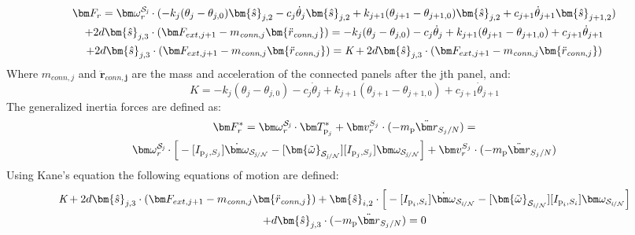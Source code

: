 \begin{multline}
	\bm F_{r} = \bm \omega_{\textit{r}}^{\cal{S}_\textit{j}} \cdot (-k_j (\theta_j-\theta_{j,0}) \bm{\hat{s}}_{j,2} - c_j \dot{\theta}_j \bm{\hat{s}}_{j,2}  +k_{j+1} (\theta_{j+1}-\theta_{j+1,0}) \bm{\hat{s}}_{j,2} +c_{j+1} \dot{\theta}_{j+1} \bm{\hat{s}}_{j+1,2})\\
	+ 2d\bm{\hat{s}}_{j,3}\cdot(\bm F_{ext,j+1} - m_{\textit{conn},j}\bm{\ddot{r}_{\textit{conn},j}}) =
	-k_j (\theta_j-\theta_{j,0}) - c_j \dot{\theta}_j + k_{j+1} (\theta_{j+1}-\theta_{j+1,0}) + c_{j+1} \dot{\theta}_{j+1}\\
	+ 2d\bm{\hat{s}}_{j,3}\cdot(\bm F_{ext,j+1} - m_{\textit{conn},j}\bm{\ddot{r}_{\textit{conn},j}}) = \textit{K} + 2d\bm{\hat{s}}_{j,3}\cdot(\bm F_{ext,j+1} - m_{\textit{conn},j}\bm{\ddot{r}_{\textit{conn},j}})
\end{multline}
Where $m_{\textit{conn},j}$ and $\bm{\ddot{r}_{\textit{conn},j}}$ are the mass and acceleration of the connected panels after the jth panel, and:
\begin{equation}
	K= -k_j (\theta_j-\theta_{j,0}) - c_j \dot{\theta}_j + k_{j+1} (\theta_{j+1}-\theta_{j+1,0}) + c_{j+1} \dot{\theta}_{j+1}
\end{equation}
The generalized inertia forces are defined as:
\begin{multline}
	\bm F^*_{r} = \bm \omega_{\textit{r}}^{\cal{S}_\textit{j}} \cdot \bm T^*_{\text{p}_j}  +\bm v^{S_j}_{r} \cdot (-m_{\text{p}} \ddot{\bm r}_{S_{j}/N}) = \\ %
	\bm \omega_{\textit{r}}^{\cal{S}_\textit{j}} \cdot \Big[-[I_{\text{p}_j,S_j}] \dot{\bm\omega}_{\cal S_{\textit{j}/N}}  -[\bm{\tilde{\omega}}_{\cal S_{\textit{j}/N}}] [I_{\text{p}_j,S_j}] \bm\omega_{\cal S_{\textit{j}/N}} \Big] + \bm v^{S_j}_{r} \cdot (-m_{\text{p}} \ddot{\bm r}_{S_{j}/N}) %
\end{multline}
Using Kane's equation the following equations of motion are defined:
\begin{multline}
	\textit{K} + 2d\bm{\hat{s}}_{j,3}\cdot(\bm F_{ext,j+1} - m_{\textit{conn},j}\bm{\ddot{r}_{\textit{conn},j}}) + \bm{\hat{s}}_{i,2} \cdot \Big[-[I_{\text{p}_i,S_i}] \dot{\bm\omega}_{\cal S_{\textit{i}/N}}  -[\bm{\tilde{\omega}}_{\cal S_{\textit{i}/N}}] [I_{\text{p}_i,S_i}] \bm\omega_{\cal S_{\textit{i}/N}} \Big]\\
	+ d\bm{\hat{s}}_{j,3} \cdot (-m_{\text{p}} \ddot{\bm r}_{S_{j}/N}) = 0 %
	\label{eq:afterkane}
\end{multline}
